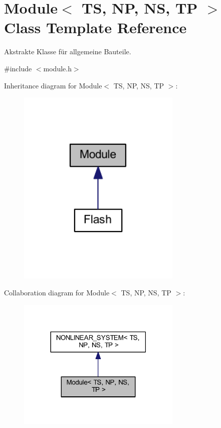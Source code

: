 \hypertarget{class_module}{}\section{Module$<$ TS, NP, NS, TP $>$ Class Template Reference}
\label{class_module}


Akstrakte Klasse für allgemeine Bauteile.  




{\ttfamily \#include $<$module.\+h$>$}



Inheritance diagram for Module$<$ TS, NP, NS, TP $>$\+:\nopagebreak
\begin{figure}[H]
\begin{center}
\leavevmode
\includegraphics[width=222pt]{class_module__inherit__graph}
\end{center}
\end{figure}


Collaboration diagram for Module$<$ TS, NP, NS, TP $>$\+:\nopagebreak
\begin{figure}[H]
\begin{center}
\leavevmode
\includegraphics[width=222pt]{class_module__coll__graph}
\end{center}
\end{figure}
